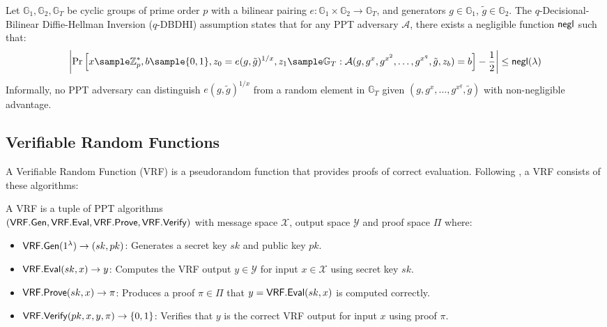 
\begin{definition}
Let $\mathbb{G}_1, \mathbb{G}_2, \mathbb{G}_T$ be cyclic groups of prime order $p$ with a bilinear pairing $e: \mathbb{G}_1 \times \mathbb{G}_2 \to \mathbb{G}_T$, and generators $g \in \mathbb{G}_1$, $\tilde{g} \in \mathbb{G}_2$. The $q$-Decisional-Bilinear Diffie-Hellman Inversion ($q$-DBDHI) assumption states that for any PPT adversary $\mathcal{A}$, there exists a negligible function $\mathsf{negl}$ such that:
\[
\left| \Pr\left[ x \sample \Z_p^*, b \sample \{0,1\}, z_0 = e(g, \tilde{g})^{1/x}, z_1 \sample \G_T : \mathcal{A}(g, g^x, g^{x^2}, \ldots, g^{x^q}, \tilde{g}, z_b) = b \right] - \frac{1}{2}\right| \leq \negl(\lambda)
\]
Informally, no PPT adversary can distinguish $e(g, \tilde{g})^{1/x}$ from a random element in $\mathbb{G}_T$ given $(g, g^x, \ldots, g^{x^q}, \tilde{g})$ with non-negligible advantage.
\end{definition}




\subsection{Verifiable Random Functions}
A Verifiable Random Function (VRF) \cite{micali_verifiable_1999, hutchison_verifiable_2005} is a pseudorandom function that provides proofs of correct evaluation. Following \cite{bitansky_verifiable_2020}, a VRF consists of these algorithms:

\begin{definition}
A VRF is a tuple of PPT algorithms \\
$(\mathsf{VRF.Gen}, \mathsf{VRF.Eval}, \mathsf{VRF.Prove}, \mathsf{VRF.Verify})$ with message space $\mathcal{X}$, output space $\mathcal{Y}$ and proof space $\Pi$ where:
\begin{itemize}
    \item $\mathsf{VRF.Gen}(1^\lambda) \to (sk, pk)$: Generates a secret key $sk$ and public key $pk$.
    \item $\mathsf{VRF.Eval}(sk,x) \to y$: Computes the VRF output $y \in \mathcal{Y}$ for input $x \in \mathcal{X}$ using secret key $sk$.
    \item $\mathsf{VRF.Prove}(sk,x) \to \pi$: Produces a proof $\pi \in \Pi$ that $y = \mathsf{VRF.Eval}(sk,x)$ is computed correctly.
    \item $\mathsf{VRF.Verify}(pk,x,y,\pi) \to \{0,1\}$: Verifies that $y$ is the correct VRF output for input $x$ using proof $\pi$.
\end{itemize}
\end{definition}

